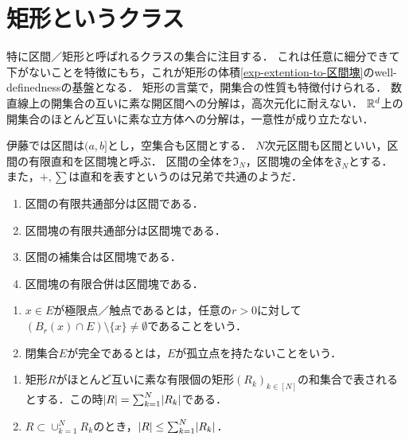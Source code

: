 \documentclass[uplatex, dvipdfmx]{jsreport}
\begin{document}
\section{矩形というクラス}

\begin{tcolorbox}[colframe=ForestGreen, colback=ForestGreen!10!white,breakable,colbacktitle=ForestGreen!40!white,coltitle=black,fonttitle=\bfseries\sffamily,
    title=伊藤記法]
    特に区間／矩形と呼ばれるクラスの集合に注目する．
    これは任意に細分できて下がないことを特徴にもち，これが矩形の体積\ref{exp-extention-to-区間塊}のwell-definednessの基盤となる．
    矩形の言葉で，開集合の性質も特徴付けられる．
    数直線上の開集合の互いに素な開区間への分解は，高次元化に耐えない．
    $\mathbb{R}^d$上の開集合のほとんど互いに素な立方体への分解は，一意性が成り立たない．

    伊藤\cite{伊藤}では区間は$(a,b]$とし，空集合も区間とする．
    $N$次元区間も区間といい，区間の有限直和を区間塊と呼ぶ．
    区間の全体を$\mathfrak{I}_N$，区間塊の全体を$\mathfrak{F}_N$とする．
    また，$+,\sum$は直和を表すというのは兄弟で共通のようだ．
\end{tcolorbox}

\begin{lemma}\mbox{}
    \begin{enumerate}
        \item 区間の有限共通部分は区間である．
        \item 区間塊の有限共通部分は区間塊である．
        \item 区間の補集合は区間塊である．
        \item 区間塊の有限合併は区間塊である．
    \end{enumerate}
\end{lemma}

\begin{definition}\mbox{}
    \begin{enumerate}
        \item $x\in E$が極限点／触点であるとは，任意の$r>0$に対して$(B_r(x)\cap E)\setminus\{x\}\ne\emptyset$であることをいう．
        \item 閉集合$E$が完全であるとは，$E$が孤立点を持たないことをいう．
    \end{enumerate}
\end{definition}

\begin{lemma}\mbox{}
    \begin{enumerate}
        \item 矩形$R$がほとんど互いに素な有限個の矩形$(R_k)_{k\in[N]}$の和集合で表されるとする．この時$\lvert R\rvert=\sum^N_{k=1}\lvert R_k\rvert$である．
        \item $R\subset\cup_{k=1}^NR_k$のとき，$\lvert R\rvert\le\sum^N_{k=1}\lvert R_k\rvert$．
    \end{enumerate}
\end{lemma}
\end{document}

